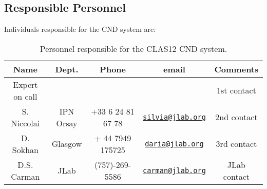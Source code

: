 \subsection{Responsible Personnel}

Individuals responsible for the CND system are:

\begin{table}[!htb]
\centering
\begin{tabular}{|c|c|c|c|c|} \hline
Name&Dept.&Phone&email&Comments \\ \hline
Expert on call& &&& 1st contact \\ \hline
S. Niccolai& IPN Orsay&+33 6 24 81 67 78&\href{mailto:silvia@jlab.org}{\nolinkurl{silvia@jlab.org}}& 2nd contact \\ \hline
D. Sokhan & Glasgow & + 44 7949 175725 &\href{mailto:daria@jlab.org}{\nolinkurl{daria@jlab.org}} & 3rd contact  \\ \hline
D.S. Carman & JLab & (757)-269-5586 & \href{mailto:carman@jlab.org}{\nolinkurl{carman@jlab.org}} & JLab contact \\ \hline
\end{tabular}
\caption{Personnel responsible for the CLAS12 CND system.} 
\label{tb:cnd}
\end{table}

